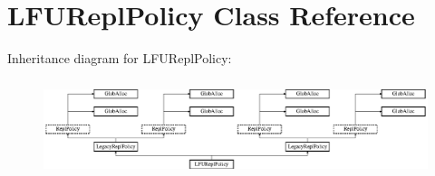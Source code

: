 \hypertarget{classLFUReplPolicy}{\section{L\-F\-U\-Repl\-Policy Class Reference}
\label{classLFUReplPolicy}
}
Inheritance diagram for L\-F\-U\-Repl\-Policy\-:\begin{figure}[H]
\begin{center}
\leavevmode
\includegraphics[height=2.868853cm]{classLFUReplPolicy}
\end{center}
\end{figure}
